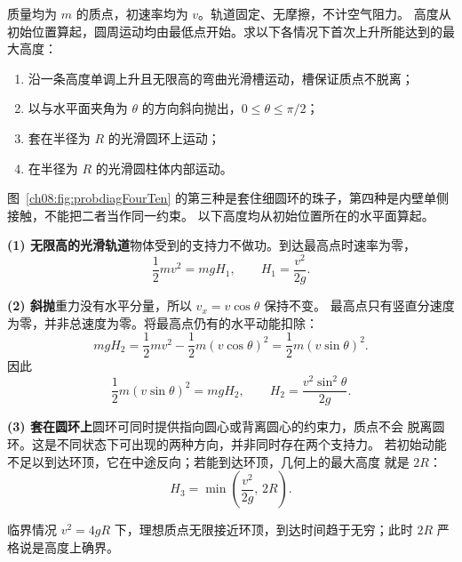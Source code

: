 {\begin{origexamplebox}{}\label{ch08:ex:s11-4-10}
质量均为 $m$ 的质点，初速率均为 $v$。轨道固定、无摩擦，不计空气阻力。
高度从初始位置算起，圆周运动均由最低点开始。求以下各情况下首次上升所能达到的最大高度：
\begin{enumerate}[label=\arabic*.,leftmargin=2.2em]
 \item 沿一条高度单调上升且无限高的弯曲光滑槽运动，槽保证质点不脱离；
 \item 以与水平面夹角为 $\theta$ 的方向斜向抛出，$0\le\theta\le\pi/2$；
 \item 套在半径为 $R$ 的光滑圆环上运动；
 \item 在半径为 $R$ 的光滑圆柱体内部运动。
\end{enumerate}
\probdiagFourTen
\end{origexamplebox}

\begin{xesolution}
图~\ref{ch08:fig:probdiagFourTen} 的第三种是套住细圆环的珠子，第四种是内壁单侧接触，不能把二者当作同一约束。
以下高度均从初始位置所在的水平面算起。

\textbf{(1) 无限高的光滑轨道}\quad 物体受到的支持力不做功。到达最高点时速率为零，
\[
 \frac12mv^2=mgH_1,
 \qquad
 \boxed{H_1=\frac{v^2}{2g}}.
\]

\textbf{(2) 斜抛}\quad 重力没有水平分量，所以 $v_x=v\cos\theta$ 保持不变。
最高点只有竖直分速度为零，并非总速度为零。将最高点仍有的水平动能扣除：
\[
 mgH_2=\frac12mv^2-\frac12m(v\cos\theta)^2=\frac12m(v\sin\theta)^2.
\]
因此
\[
 \frac12m(v\sin\theta)^2=mgH_2,
 \qquad
 \boxed{H_2=\frac{v^2\sin^2\theta}{2g}}.
\]

\textbf{(3) 套在圆环上}\quad 圆环可同时提供指向圆心或背离圆心的约束力，质点不会
脱离圆环。这是不同状态下可出现的两种方向，并非同时存在两个支持力。
若初始动能不足以到达环顶，它在中途反向；若能到达环顶，几何上的最大高度
就是 $2R$：
\[
 \boxed{H_3=\min\left(\frac{v^2}{2g},\,2R\right)}.
\]

临界情况 $v^2=4gR$ 下，理想质点无限接近环顶，到达时间趋于无穷；此时 $2R$ 严格说是高度上确界。


\end{xesolution}}
